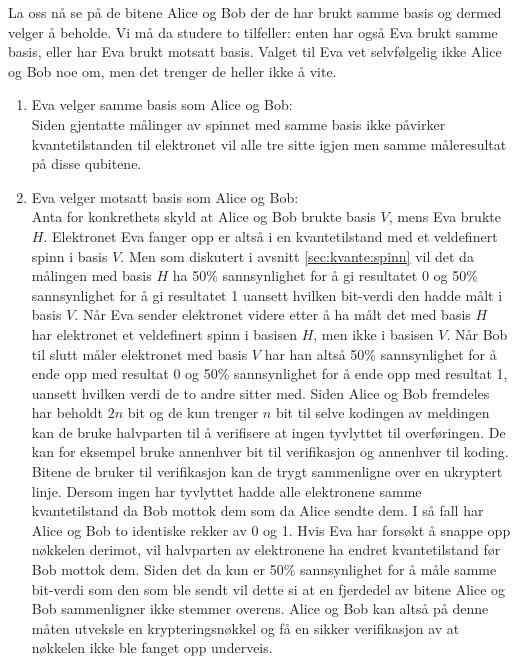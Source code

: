 La oss nå se på de bitene Alice og Bob der de har brukt samme basis og dermed velger å beholde. Vi må da studere to tilfeller: enten har også Eva brukt samme basis, eller har Eva brukt motsatt basis. Valget til Eva vet selvfølgelig ikke Alice og Bob noe om, men det trenger de heller ikke å vite. 
\begin{enumerate}
\item
Eva velger samme basis som Alice og Bob: \\
Siden gjentatte målinger av spinnet med samme basis ikke påvirker kvantetilstanden til elektronet vil alle tre sitte igjen men samme måleresultat på disse qubitene. 
\item
Eva velger motsatt basis som Alice og Bob: \\
Anta for konkrethets skyld at Alice og Bob brukte basis $V$, mens Eva brukte $H$. Elektronet Eva fanger opp er altså i en kvantetilstand med et veldefinert spinn i basis $V$. Men som diskutert i avsnitt \ref{sec:kvante:spinn} vil det da målingen med basis $H$ ha 50\% sannsynlighet for å gi resultatet 0 og 50\% sannsynlighet for å gi resultatet 1 uansett hvilken bit-verdi den hadde målt i basis $V$. Når Eva sender elektronet videre etter å ha målt det med basis $H$ har elektronet et veldefinert spinn i basisen $H$, men ikke i basisen $V$. Når Bob til slutt måler elektronet med basis $V$ har han altså 50\% sannsynlighet for å ende opp med resultat 0 og 50\% sannsynlighet for å ende opp med resultat 1, uansett hvilken verdi de to andre sitter med. Siden Alice og Bob fremdeles har beholdt $2n$ bit og de kun trenger $n$ bit til selve kodingen av meldingen kan de bruke halvparten til å verifisere at ingen tyvlyttet til overføringen. De kan for eksempel bruke annenhver bit til verifikasjon og annenhver til koding. Bitene de bruker til verifikasjon kan de trygt sammenligne over en ukryptert linje. Dersom ingen har tyvlyttet hadde alle elektronene samme kvantetilstand da Bob mottok dem som da Alice sendte dem. I så fall har Alice og Bob to identiske rekker av 0 og 1. Hvis Eva har forsøkt å snappe opp nøkkelen derimot, vil halvparten av elektronene ha endret kvantetilstand før Bob mottok dem. Siden det da kun er 50\% sannsynlighet for å måle samme bit-verdi som den som ble sendt vil dette si at en fjerdedel av bitene Alice og Bob sammenligner ikke stemmer overens. Alice og Bob kan altså på denne måten utveksle en krypteringsnøkkel og få en sikker verifikasjon av at nøkkelen ikke ble fanget opp underveis.
\end{enumerate}
